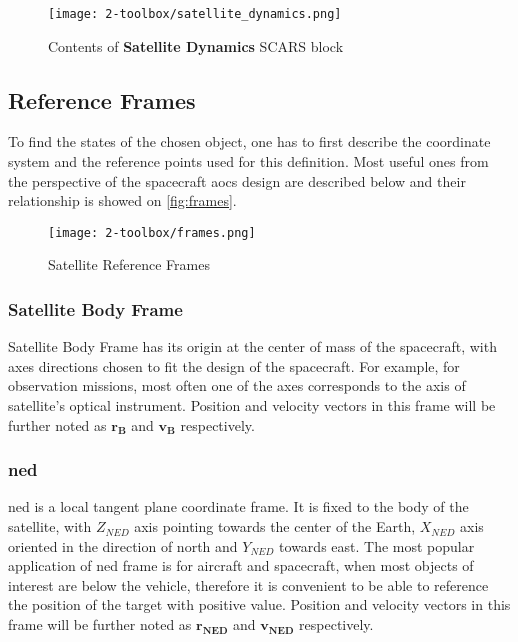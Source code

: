     \begin{figure}[H]
        \centering
        \texttt{[image: 2-toolbox/satellite\_dynamics.png]}
        \caption{Contents of \textbf{Satellite Dynamics} SCARS block}
        \label{fig:satellite_dynamics}
    \end{figure}






\subsection{Reference Frames}\label{sec:frames}
    To find the states of the chosen object, one has to first describe the coordinate system and the reference points used for this definition. Most useful ones from the perspective of the spacecraft \ac{aocs} design are described below and their relationship is showed on \autoref{fig:frames}.

    \begin{figure}[H]
        \centering
        \texttt{[image: 2-toolbox/frames.png]}
        \caption{Satellite Reference Frames\cite{6ecef-frames}}
        \label{fig:frames}
    \end{figure}

    \subsubsection{Satellite Body Frame}
        Satellite Body Frame has its origin at the center of mass of the spacecraft, with axes directions chosen to fit the design of the spacecraft. For example, for observation missions, most often one of the axes corresponds to the axis of satellite's optical instrument. Position and velocity vectors in this frame will be further noted as $\textbf{r}_\textbf{B}$ and $\textbf{v}_\textbf{B}$ respectively.

    \subsubsection{\ac*{ned}}
        \ac{ned} is a local tangent plane coordinate frame. It is fixed to the body of the satellite, with $Z_{NED}$ axis pointing towards the center of the Earth, $X_{NED}$ axis oriented in the direction of north and $Y_{NED}$ towards east. The most popular application of \ac{ned} frame is for aircraft and spacecraft, when most objects of interest are below the vehicle, therefore it is convenient to be able to reference the position of the target with positive value. Position and velocity vectors in this frame will be further noted as $\textbf{r}_\textbf{NED}$ and $\textbf{v}_\textbf{NED}$ respectively.

